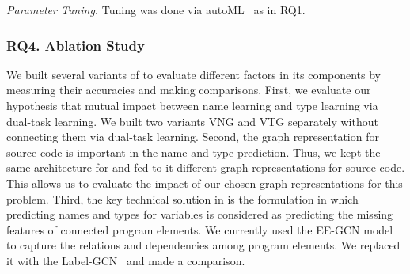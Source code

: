 
{\em Parameter Tuning.} Tuning was done via
autoML~\cite{NNI} as in RQ1.


\subsubsection{RQ4. Ablation Study}

We built several variants of {\tool} to evaluate different factors in
its components by measuring their accuracies and making comparisons.
First, we evaluate our hypothesis that mutual impact between name
learning and type learning via dual-task learning. We built two
variants VNG and VTG separately without connecting them via dual-task
learning. Second, the graph representation for source code is
important in the name and type prediction. Thus, we kept the same
architecture for {\tool} and fed to it different graph representations
for source code. This allows us to evaluate the impact of our chosen
graph representations for this problem. Third, the key technical
solution in {\tool} is the formulation in which predicting names and
types for variables is considered as predicting the missing features
of connected program elements. We currently used the EE-GCN model to
capture the relations and dependencies among program elements. We
replaced it with the Label-GCN~\cite{label-gcn} and made a comparison.


